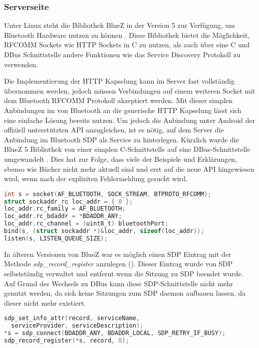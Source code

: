         \subsubsection{Serverseite}        
        Unter Linux steht die Bibliothek BlueZ in der Version 5 zur Verfügung, um Bluetooth Hardware nutzen zu können \cite{bluezMigration}. Diese Bibliothek bietet die Möglichkeit, RFCOMM Sockets wie HTTP Sockets in C zu nutzen, als auch über eine C und DBus Schnittstelle andere Funktionen wie das Service Discovery Protokoll zu verwenden.
        
        Die Implementierung der HTTP Kapselung kann im Server fast vollständig übernommen werden, jedoch müssen Verbindungen auf einem weiteren Socket mit dem Bluetooth RFCOMM Protokoll akzeptiert werden. Mit dieser simplen Anbindungen im  von Bluetooth an die generische HTTP Kapselung lässt sich eine einfache Lösung bereits nutzen. Um jedoch die Anbindung unter Android der offiziell unterstützten API anzugleichen, ist es nötig, auf dem Server die Anbindung im Bluetooth SDP als Service zu hinterlegen. Kürzlich wurde die BlueZ 5 Bibliothek von einer simplen C-Schnittstelle auf eine DBus-Schnittstelle umgewandelt \cite{bluezMigration}. Dies hat zur Folge, dass viele der Beispiele und Erklärungen, ebenso wie Bücher nicht mehr aktuell sind und erst auf die neue API hingewiesen wird, wenn nach der expliziten Fehlermeldung gesucht wird.

        \begin{lstlisting}[frame=bt, label={lst:bluetooth:socket}, language=C, caption=Verbindungsaufbau mit Bluetooth (Servercode in C)]
int s = socket(AF_BLUETOOTH, SOCK_STREAM, BTPROTO_RFCOMM);
struct sockaddr_rc loc_addr = { 0 };
loc_addr.rc_family = AF_BLUETOOTH;
loc_addr.rc_bdaddr = *BDADDR_ANY;
loc_addr.rc_channel = (uint8_t) bluetoothPort;
bind(s, (struct sockaddr *)&loc_addr, sizeof(loc_addr));
listen(s, LISTEN_QUEUE_SIZE);
        \end{lstlisting}        
        
        In älteren Versionen von BlueZ war es möglich einen SDP Eintrag mit der Methode {\it sdp\_record\_register} anzulegen (). Dieser Eintrag wurde von SDP selbstständig verwaltet und entfernt wenn die Sitzung zu SDP beendet wurde. Auf Grund des Wechsels zu DBus kann diese SDP-Schnittstelle nicht mehr genutzt werden, da sich keine Sitzungen zum SDP daemon aufbauen lassen, da dieser nicht mehr existiert.
        
        \begin{lstlisting}[frame=bt, label={lst:bluetooth:sdp}, language=C, caption=Veraltete Nutzung von SDP (Servercode in C)]
sdp_set_info_attr(record, serviceName,
  serviceProvider, serviceDescription);
*s = sdp_connect(BDADDR_ANY, BDADDR_LOCAL, SDP_RETRY_IF_BUSY);
sdp_record_register(*s, record, 0);
        \end{lstlisting}
        
